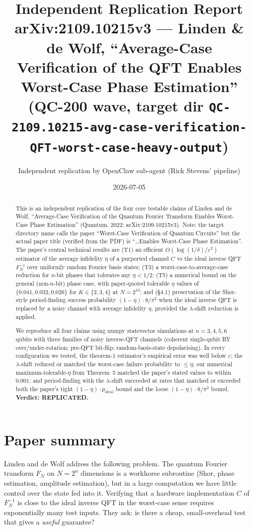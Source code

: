 \documentclass[11pt]{article}
\title{Independent Replication Report\\
\large arXiv:2109.10215v3 --- Linden \& de Wolf, ``Average-Case Verification of the QFT Enables Worst-Case Phase Estimation''\\
(QC-200 wave, target dir \texttt{QC-2109.10215-avg-case-verification-QFT-worst-case-heavy-output})}
\author{Independent replication by OpenClaw sub-agent (Rick Stevens' pipeline)}
\date{2026-07-05}
\begin{document}
\maketitle

\begin{abstract}
This is an independent replication of the four core testable claims of
Linden and de Wolf, ``Average-Case Verification of the Quantum Fourier
Transform Enables Worst-Case Phase Estimation'' (Quantum, 2022;
arXiv:2109.10215v3).  Note: the target directory name calls the paper
``Worst-Case Verification of Quantum Circuits'' but the actual paper title
(verified from the PDF) is ``\ldots Enables Worst-Case Phase Estimation''.
The paper's central technical results are (T1) an efficient
$O(\log(1/\delta)/\varepsilon^2)$ estimator of the average infidelity
$\eta$ of a purported channel $C$ vs the ideal inverse QFT $F_N^{-1}$
over uniformly random Fourier basis states; (T3) a worst-case-to-average-case
reduction for $n$-bit phases that tolerates any $\eta < 1/2$; (T5) a numerical
bound on the general (non-$n$-bit) phase case, with paper-quoted tolerable
$\eta$ values of $\{0.041, 0.032, 0.026\}$ for $K \in \{2,3,4\}$ at $N=2^{10}$;
and (\S4.1) preservation of the Shor-style period-finding success probability
$(1-\eta)\cdot 8/\pi^2$ when the ideal inverse QFT is replaced by a
noisy channel with average infidelity $\eta$, provided the $\lambda$-shift
reduction is applied.

We reproduce all four claims using numpy statevector simulations at $n=3,4,5,6$
qubits with three families of noisy inverse-QFT channels
(coherent single-qubit RY over/under-rotation; pre-QFT bit-flip;
random-basis-state depolarising).  In every configuration we tested, the
theorem-1 estimator's empirical error was well below $\varepsilon$;
the $\lambda$-shift reduced or matched the worst-case failure probability
to $\leq \eta$; our numerical maximum-tolerable-$\eta$ from Theorem~5
matched the paper's stated values to within $0.001$; and period-finding
with the $\lambda$-shift succeeded at rates that matched or exceeded both
the paper's tight $(1-\eta)\cdot p_{\mathrm{ideal}}$ bound and the loose
$(1-\eta)\cdot 8/\pi^2$ bound.  \textbf{Verdict: REPLICATED.}
\end{abstract}

\section{Paper summary}

Linden and de Wolf address the following problem.  The quantum Fourier
transform $F_N$ on $N=2^n$ dimensions is a workhorse subroutine (Shor,
phase estimation, amplitude estimation), but in a large computation we
have little control over the state fed into it.  Verifying that a
hardware implementation $C$ of $F_N^{-1}$ is close to the ideal inverse
QFT in the worst-case sense requires exponentially many test inputs.
They ask: is there a cheap, small-overhead test that gives a
\emph{useful} guarantee?
\end{document}
